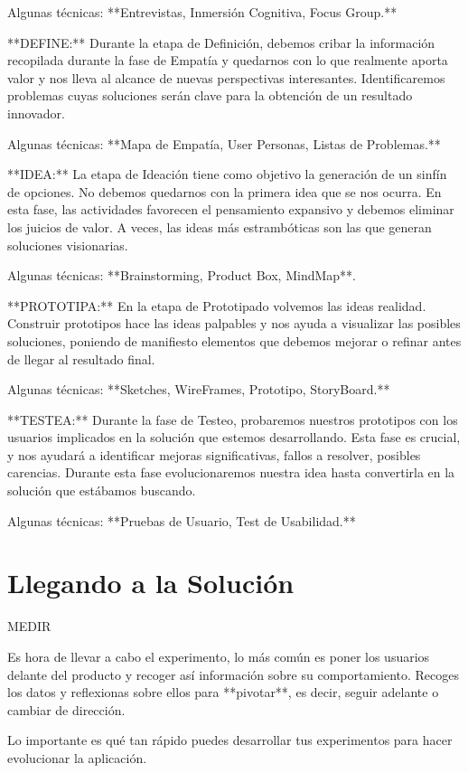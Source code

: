 \documentclass[12pt,twoside,titlepage]{report}
\begin{document}
Algunas técnicas: **Entrevistas, Inmersión Cognitiva, Focus Group.**

**DEFINE:** Durante la etapa de Definición, debemos cribar la información recopilada durante la fase de Empatía y quedarnos con lo que realmente aporta valor y nos lleva al alcance de nuevas perspectivas interesantes. Identificaremos problemas cuyas soluciones serán clave para la obtención de un resultado innovador.

Algunas técnicas: **Mapa de Empatía, User Personas, Listas de Problemas.**

**IDEA:** La etapa de Ideación tiene como objetivo la generación de un sinfín de opciones. No debemos quedarnos con la primera idea que se nos ocurra. En esta fase, las actividades favorecen el pensamiento expansivo y debemos eliminar los juicios de valor. A veces, las ideas más estrambóticas son las que generan soluciones visionarias.

Algunas técnicas: **Brainstorming, Product Box, MindMap**.

**PROTOTIPA:** En la etapa de Prototipado volvemos las ideas realidad. Construir prototipos hace las ideas palpables y nos ayuda a visualizar las posibles soluciones, poniendo de manifiesto elementos que debemos mejorar o refinar antes de llegar al resultado final.

Algunas técnicas: **Sketches, WireFrames, Prototipo, StoryBoard.**

**TESTEA:** Durante la fase de Testeo, probaremos nuestros prototipos con los usuarios implicados en la solución que estemos desarrollando. Esta fase es crucial, y nos ayudará a identificar mejoras significativas, fallos a resolver, posibles carencias. Durante esta fase evolucionaremos nuestra idea hasta convertirla en la solución que estábamos buscando.

Algunas técnicas: **Pruebas de Usuario, Test de Usabilidad.**

\section{Llegando a la Solución}

MEDIR

Es hora de llevar a cabo el experimento, lo más común es poner los usuarios delante del producto y recoger así información sobre su comportamiento. Recoges los datos y reflexionas sobre ellos para **pivotar**, es decir, seguir adelante o cambiar de dirección. 

Lo importante es qué tan rápido puedes desarrollar tus experimentos para hacer evolucionar la aplicación. 
\end{document}

